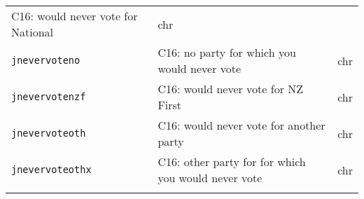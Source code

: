\documentclass[]{article}
\begin{document}
\begin{longtable}[]{@{}lll@{}}
\begin{minipage}[t]{0.70\columnwidth}
C16: would never vote for National\strut
\end{minipage} & \begin{minipage}[t]{0.08\columnwidth}\raggedright\strut
chr\strut
\end{minipage}\tabularnewline
\begin{minipage}[t]{0.14\columnwidth}\raggedright\strut
\texttt{jnevervoteno}\strut
\end{minipage} & \begin{minipage}[t]{0.70\columnwidth}\raggedright\strut
C16: no party for which you would never vote\strut
\end{minipage} & \begin{minipage}[t]{0.08\columnwidth}\raggedright\strut
chr\strut
\end{minipage}\tabularnewline
\begin{minipage}[t]{0.14\columnwidth}\raggedright\strut
\texttt{jnevervotenzf}\strut
\end{minipage} & \begin{minipage}[t]{0.70\columnwidth}\raggedright\strut
C16: would never vote for NZ First\strut
\end{minipage} & \begin{minipage}[t]{0.08\columnwidth}\raggedright\strut
chr\strut
\end{minipage}\tabularnewline
\begin{minipage}[t]{0.14\columnwidth}\raggedright\strut
\texttt{jnevervoteoth}\strut
\end{minipage} & \begin{minipage}[t]{0.70\columnwidth}\raggedright\strut
C16: would never vote for another party\strut
\end{minipage} & \begin{minipage}[t]{0.08\columnwidth}\raggedright\strut
chr\strut
\end{minipage}\tabularnewline
\begin{minipage}[t]{0.14\columnwidth}\raggedright\strut
\texttt{jnevervoteothx}\strut
\end{minipage} & \begin{minipage}[t]{0.70\columnwidth}\raggedright\strut
C16: other party for for which you would never vote\strut
\end{minipage} & \begin{minipage}[t]{0.08\columnwidth}\raggedright\strut
chr\strut
\end{minipage}\tabularnewline
\begin{minipage}[t]{0.14\columnwidth}\raggedright\strut

\end{minipage}
\end{longtable}
\end{document}

